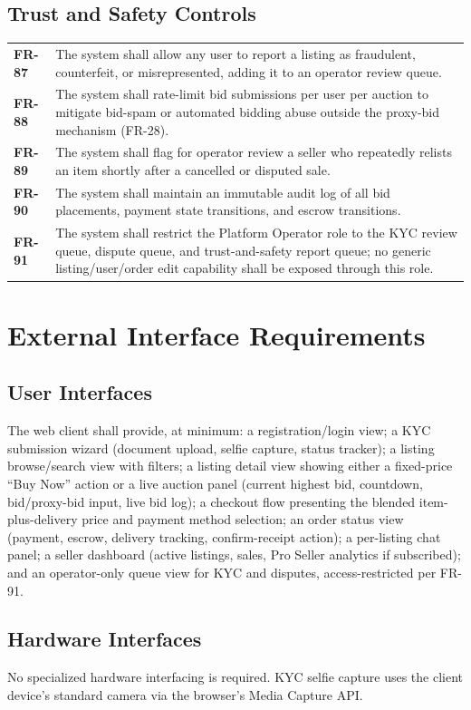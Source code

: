 \documentclass[11pt,a4paper]{report}
\newenvironment{reqtable}{\begin{longtable}{p{2.2cm}p{11.5cm}}}{\end{longtable}}
\begin{document}
\section{Trust and Safety Controls}
\begin{reqtable}
\textbf{FR-87} & The system shall allow any user to report a listing as fraudulent, counterfeit, or misrepresented, adding it to an operator review queue. \\
\textbf{FR-88} & The system shall rate-limit bid submissions per user per auction to mitigate bid-spam or automated bidding abuse outside the proxy-bid mechanism (FR-28). \\
\textbf{FR-89} & The system shall flag for operator review a seller who repeatedly relists an item shortly after a cancelled or disputed sale. \\
\textbf{FR-90} & The system shall maintain an immutable audit log of all bid placements, payment state transitions, and escrow transitions. \\
\textbf{FR-91} & The system shall restrict the Platform Operator role to the KYC review queue, dispute queue, and trust-and-safety report queue; no generic listing/user/order edit capability shall be exposed through this role. \\
\end{reqtable}

\chapter{External Interface Requirements}

\section{User Interfaces}
The web client shall provide, at minimum: a registration/login view; a KYC submission wizard (document upload, selfie capture, status tracker); a listing browse/search view with filters; a listing detail view showing either a fixed-price ``Buy Now'' action or a live auction panel (current highest bid, countdown, bid/proxy-bid input, live bid log); a checkout flow presenting the blended item-plus-delivery price and payment method selection; an order status view (payment, escrow, delivery tracking, confirm-receipt action); a per-listing chat panel; a seller dashboard (active listings, sales, Pro Seller analytics if subscribed); and an operator-only queue view for KYC and disputes, access-restricted per FR-91.

\section{Hardware Interfaces}
No specialized hardware interfacing is required. KYC selfie capture uses the client device's standard camera via the browser's Media Capture API.
\end{document}
